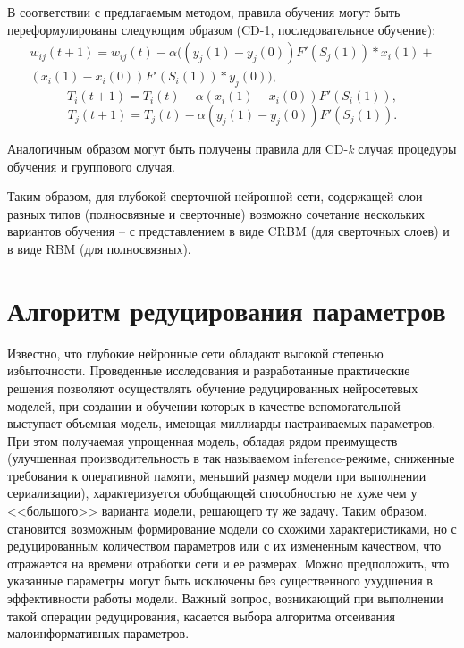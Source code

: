 В соответствии с предлагаемым методом, правила обучения могут быть переформулированы следующим образом (CD-1, последовательное обучение):
\begin{multline*}
    w_{ij}(t+1)=w_{ij}(t)-\alpha((y_j(1)-y_j(0))F'(S_j(1)) * x_i(1)+\\(x_i(1)-x_i(0))F'(S_i(1)) * y_j(0)),    
\end{multline*}
\begin{equation*}
    T_i(t+1)=T_i(t)-\alpha(x_i(1)-x_i(0))F'(S_i(1)),
\end{equation*}
\begin{equation*}
    T_j(t+1)=T_j(t)-\alpha(y_j(1)-y_j(0))F'(S_j(1)).  
\end{equation*}

Аналогичным образом могут быть получены правила для CD-\textit{k} случая процедуры обучения и группового случая.

Таким образом, для глубокой сверточной нейронной сети, содержащей слои разных типов (полносвязные и сверточные) возможно сочетание нескольких вариантов обучения -- с представлением в виде CRBM (для сверточных слоев) и в виде RBM (для полносвязных).  

\section{Алгоритм редуцирования параметров}
Известно, что глубокие нейронные сети обладают высокой степенью
избыточности. Проведенные исследования и разработанные практические решения
позволяют осуществлять обучение редуцированных нейросетевых моделей, при
создании и обучении которых в качестве вспомогательной выступает объемная модель, имеющая миллиарды настраиваемых параметров. При этом
получаемая упрощенная модель, обладая рядом преимуществ (улучшенная производительность в так называемом inference-режиме, сниженные требования к оперативной памяти,
меньший размер модели при выполнении сериализации), характеризуется обобщающей способностью не хуже чем у <<большого>> варианта модели, решающего ту же задачу.
Таким образом, становится возможным формирование модели со схожими характеристиками, но с редуцированным количеством параметров или с их
измененным качеством, что отражается на времени отработки сети и ее размерах.
Можно предположить, что указанные параметры могут быть исключены без
существенного ухудшения в эффективности работы модели. Важный вопрос,
возникающий при выполнении такой операции редуцирования, касается выбора
алгоритма отсеивания малоинформативных параметров.

